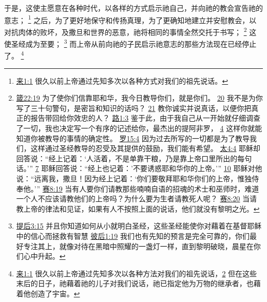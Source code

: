 \documentclass[12pt, a4paper, oneside]{ctexart}
\begin{document}
	于是，这使主愿意在各种时代，以各样的方式启示祂自己，并向祂的教会宣告祂的意志；
	\footnote {
		\href{https://biblehub.com/hebrews/1-1.htm}{来1:1} 很久以前上帝通过先知多次以各种方式对我们的祖先说话。
	}
	之后，为了更好地保守和传扬真理，为了更确知地建立并安慰教会，以对抗肉体的败坏，及撒旦和世界的恶意，祂将相同的事情全然交托于书写；
	\footnote {
		\href{https://biblehub.com/proverbs/22-19.htm}{箴22:19} 为了使你们信靠耶和华，我今日教导你们，就是你们。
		\href{https://biblehub.com/proverbs/22-20.htm}{20} 我不是为你写了三十句警句，是密旨和知识的话吗？
		\href{https://biblehub.com/proverbs/22-21.htm}{21} 教你诚实并说真话，以便你把真正的报告带回给你效忠的人？ 
		\href{https://biblehub.com/luke/1-3.htm}{路1:3} 鉴于此，由于我自己从一开始就仔细调查了一切，我也决定写一个有序的记述给你，最杰出的提阿非罗，
		\href{https://biblehub.com/luke/1-4.htm}{4} 这样你就能知道你被教导的事情的确定性。
		\href{https://biblehub.com/romans/15-4.htm}{罗15:4} 因为过去所写的一切都是为了教导我们，这样通过圣经教导的忍受及其提供的鼓励，我们能有希望。 
		\href{https://biblehub.com/matthew/4-4.htm}{太4:4} 耶稣却回答说：“经上记着：‘人活着，不是单靠干粮，乃是靠上帝口里所出的每句话。’” 
		\href{https://biblehub.com/matthew/4-7.htm}{7} 耶稣回答说：“经上也记着：'不要诱惑耶和华你的上帝。’”
		\href{https://biblehub.com/matthew/4-10.htm}{10} 耶稣对他说：“远离我，撒旦！因为经上记着：‘你们要敬拜耶和华你们的上帝，惟独侍奉他。’”
		\href{https://biblehub.com/isaiah/8-19.htm}{赛8:19} 当有人要你们请教那些喃喃自语的招魂的术士和巫师时，难道一个人不应该请教他们的上帝吗？为什么要为生者请教死人呢？
		\href{https://biblehub.com/isaiah/8-20.htm}{赛8:20} 当请教上帝的律法和见证，如果有人不按照上面的说话，他们就没有黎明之光。
	}
	这使圣经成为至要；
	\footnote {
		\href{https://biblehub.com/2_timothy/3-15.htm}{提后3:15} 并且你知道如何从小就明白圣经，这些圣经能使你对藉着在基督耶稣中的信心而拯救有智慧
		\href{https://biblehub.com/2_peter/1-19.htm}{彼后1:19} 我们也有先知的预言是完全可靠的，你们最好专注其上，就像对待在黑暗中照耀的一盏灯一样，直到黎明破晓，晨星在你们心中升起。
	}
	而上帝从前向祂的子民启示祂意志的那些方法现在已经停止了。
	\footnote {
		\href{https://biblehub.com/hebrews/1-1.htm}{来1:1} 很久以前上帝通过先知多次以各种方法对我们的祖先说话，\href{https://biblehub.com/hebrews/1-2.htm}{2} 但在这些末后的日子，祂藉着祂的儿子对我们说话，祂已指定他为万物的继承者，也藉着他创造了宇宙。
	}
\end{document}
